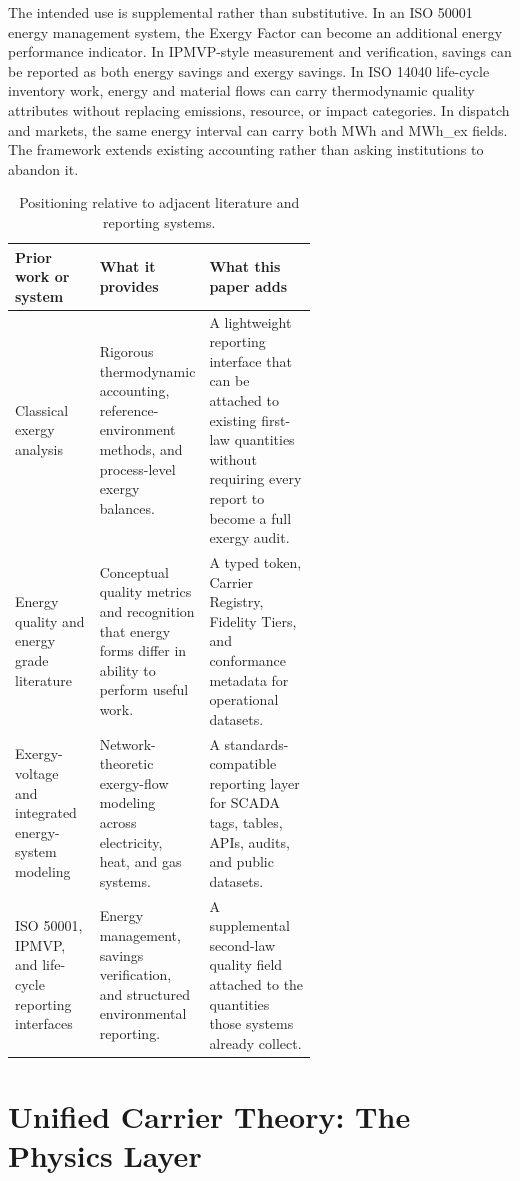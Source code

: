 \documentclass[11pt]{article}
\begin{document}
The intended use is supplemental rather than substitutive. In an ISO 50001 energy management system, the Exergy Factor can become an additional energy performance indicator. In IPMVP-style measurement and verification, savings can be reported as both energy savings and exergy savings. In ISO 14040 life-cycle inventory work, energy and material flows can carry thermodynamic quality attributes without replacing emissions, resource, or impact categories. In dispatch and markets, the same energy interval can carry both MWh and MWh\_ex fields. The framework extends existing accounting rather than asking institutions to abandon it.

\begin{table}[H]
\centering
\small
\caption{Positioning relative to adjacent literature and reporting systems.}
\label{tab:prior_work_positioning}
\begin{tabularx}{\linewidth}{@{}p{0.28\linewidth}p{0.32\linewidth}X@{}}
\toprule
Prior work or system & What it provides & What this paper adds \\
\midrule
Classical exergy analysis \cite{kotas1985,szargut2005,bejan2016} & Rigorous thermodynamic accounting, reference-environment methods, and process-level exergy balances. & A lightweight reporting interface that can be attached to existing first-law quantities without requiring every report to become a full exergy audit. \\
Energy quality and energy grade literature \cite{chen2022} & Conceptual quality metrics and recognition that energy forms differ in ability to perform useful work. & A typed token, Carrier Registry, Fidelity Tiers, and conformance metadata for operational datasets. \\
Exergy-voltage and integrated energy-system modeling \cite{li2022} & Network-theoretic exergy-flow modeling across electricity, heat, and gas systems. & A standards-compatible reporting layer for SCADA tags, tables, APIs, audits, and public datasets. \\
ISO 50001, IPMVP, and life-cycle reporting interfaces \cite{evo2022,iso14040,iso50001} & Energy management, savings verification, and structured environmental reporting. & A supplemental second-law quality field attached to the quantities those systems already collect. \\
\bottomrule
\end{tabularx}
\end{table}

\section{Unified Carrier Theory: The Physics Layer}
\end{document}
